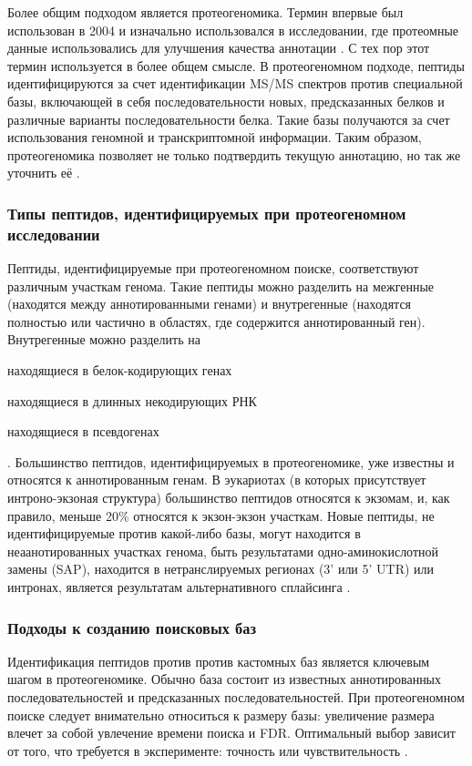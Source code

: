 Более общим подходом является протеогеномика. Термин впервые был использован в 2004 и изначально использовался в исследовании, где протеомные данные использовались для улучшения качества аннотации \cite{jaffe2004proteogenomic}. С тех пор этот термин используется в более общем смысле. В протеогеномном подходе, пептиды идентифицируются за счет идентификации MS/MS спектров против специальной базы, включающей в себя последовательности новых, предсказанных белков и различные варианты последовательности белка. Такие базы получаются за счет использования геномной и транскриптомной информации. Таким образом, протеогеномика позволяет не только подтвердить текущую аннотацию, но так же уточнить её \cite{nesvizhskii2014proteogenomics}. 

\subsubsection{Типы пептидов, идентифицируемых при протеогеномном исследовании}
Пептиды, идентифицируемые при протеогеномном поиске, соответствуют различным участкам генома. Такие пептиды можно разделить на межгенные (находятся между аннотированными генами) и внутрегенные (находятся полностью или частично в областях, где содержится аннотированный ген). Внутрегенные можно разделить на 
\begin{inparaenum}
    \item находящиеся в белок-кодирующих генах 
    \item находящиеся в длинных некодирующих РНК
    \item находящиеся в псевдогенах
\end{inparaenum} \cite{harrow2012gencode}. Большинство пептидов, идентифицируемых в протеогеномике, уже известны и относятся к аннотированным генам. В эукариотах (в которых присутствует интроно-экзоная структура) большинство пептидов относятся к экзомам, и, как правило, меньше 20\% относятся к экзон-экзон участкам. Новые пептиды, не идентифицируемые против какой-либо базы, могут находится в неаанотированных участках генома, быть результатами одно-аминокислотной замены (SAP), находится в нетранслируемых регионах (3' или 5' UTR) или интронах, является результатам альтернативного сплайсинга \cite{nesvizhskii2014proteogenomics}.

\subsubsection{Подходы к созданию поисковых баз}
Идентификация пептидов против против кастомных баз является ключевым шагом в протеогеномике. Обычно база состоит из известных аннотированных последовательностей и предсказанных последовательностей. При протеогеномном поиске следует внимательно относиться к размеру базы: увеличение размера влечет за собой увлечение времени поиска и FDR. Оптимальный выбор зависит от того, что требуется в эксперименте: точность или чувствительность \cite{nesvizhskii2014proteogenomics}.

